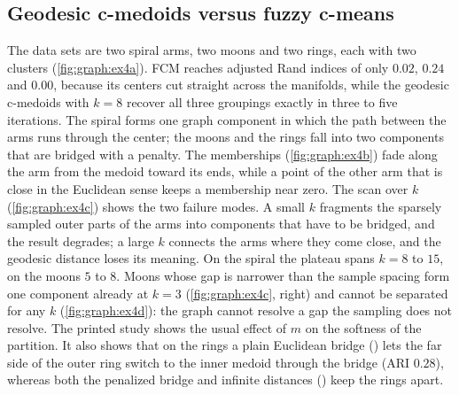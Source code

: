 
\subsection{Geodesic c-medoids versus fuzzy c-means}

The data sets are two spiral arms, two moons and two rings, each with two clusters (\cref{fig:graph:ex4a}). FCM reaches adjusted Rand indices of only $0.02$, $0.24$ and $0.00$, because its centers cut straight across the manifolds, while the geodesic c-medoids with $k=8$ recover all three groupings exactly in three to five iterations. The spiral forms one graph component in which the path between the arms runs through the center; the moons and the rings fall into two components that are bridged with a penalty. The memberships (\cref{fig:graph:ex4b}) fade along the arm from the medoid toward its ends, while a point of the other arm that is close in the Euclidean sense keeps a membership near zero. The scan over $k$ (\cref{fig:graph:ex4c}) shows the two failure modes. A small $k$ fragments the sparsely sampled outer parts of the arms into components that have to be bridged, and the result degrades; a large $k$ connects the arms where they come close, and the geodesic distance loses its meaning. On the spiral the plateau spans $k=8$ to $15$, on the moons $5$ to $8$. Moons whose gap is narrower than the sample spacing form one component already at $k=3$ (\cref{fig:graph:ex4c}, right) and cannot be separated for any $k$ (\cref{fig:graph:ex4d}): the graph cannot resolve a gap the sampling does not resolve. The printed study shows the usual effect of $m$ on the softness of the partition. It also shows that on the rings a plain Euclidean bridge () lets the far side of the outer ring switch to the inner medoid through the bridge (ARI $0.28$), whereas both the penalized bridge and infinite distances () keep the rings apart.


